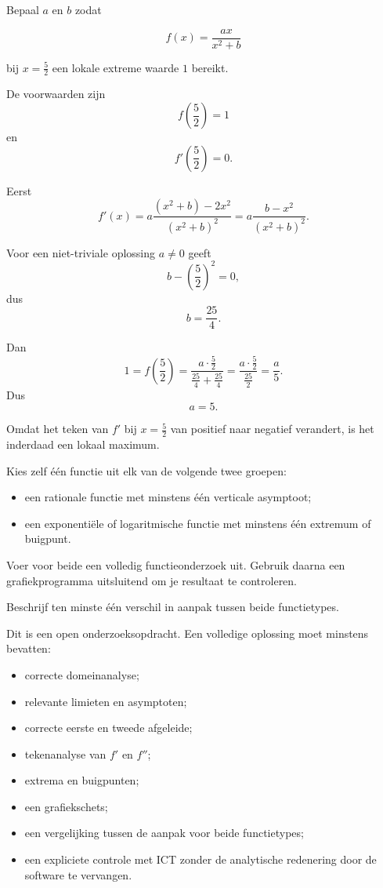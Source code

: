 \documentclass{ximera}
\begin{document}
\begin{oefening}{\oefG}
Bepaal \(a\) en \(b\) zodat

\[
f(x)=\frac{ax}{x^2+b}
\]

bij \(x=\frac52\) een lokale extreme waarde \(1\) bereikt.

\begin{oplossing}
De voorwaarden zijn
\[
f\left(\frac52\right)=1
\]
en
\[
f'\left(\frac52\right)=0.
\]

Eerst
\[
f'(x)
=
a\frac{(x^2+b)-2x^2}{(x^2+b)^2}
=
a\frac{b-x^2}{(x^2+b)^2}.
\]

Voor een niet-triviale oplossing \(a\neq0\) geeft
\[
b-\left(\frac52\right)^2=0,
\]
dus
\[
\boxed{b=\frac{25}{4}}.
\]

Dan
\[
1
=
f\left(\frac52\right)
=
\frac{a\cdot\frac52}{\frac{25}{4}+\frac{25}{4}}
=
\frac{a\cdot\frac52}{\frac{25}{2}}
=
\frac a5.
\]
Dus
\[
\boxed{a=5}.
\]

Omdat het teken van \(f'\) bij \(x=\frac52\) van positief naar negatief
verandert, is het inderdaad een lokaal maximum.
\end{oplossing}
\end{oefening}

\begin{oefening}{\oefG}
Kies zelf één functie uit elk van de volgende twee groepen:

\begin{itemize}
  \item een rationale functie met minstens één verticale asymptoot;
  \item een exponentiële of logaritmische functie met minstens één extremum of buigpunt.
\end{itemize}

Voer voor beide een volledig functieonderzoek uit. Gebruik daarna een
grafiekprogramma uitsluitend om je resultaat te controleren.

Beschrijf ten minste één verschil in aanpak tussen beide functietypes.

\begin{oplossing}
Dit is een open onderzoeksopdracht. Een volledige oplossing moet minstens
bevatten:

\begin{itemize}
  \item correcte domeinanalyse;
  \item relevante limieten en asymptoten;
  \item correcte eerste en tweede afgeleide;
  \item tekenanalyse van \(f'\) en \(f''\);
  \item extrema en buigpunten;
  \item een grafiekschets;
  \item een vergelijking tussen de aanpak voor beide functietypes;
  \item een expliciete controle met ICT zonder de analytische redenering
  door de software te vervangen.
\end{itemize}
\end{oplossing}
\end{oefening}
\end{document}
